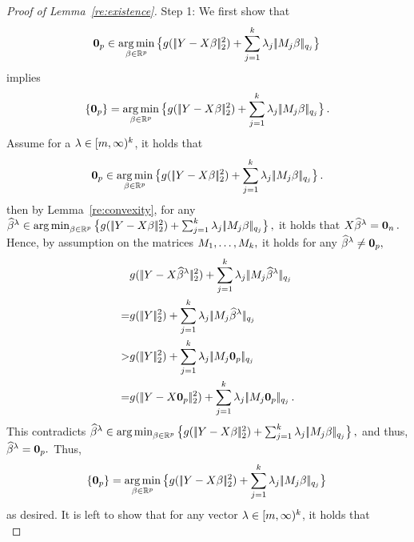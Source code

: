 \documentclass[bj]{imsart}
\newcommand{\normtwo}[1]{\ensuremath{\!|\!| #1 | \! |_{2}}}
\newcommand{\normqj}[1]{\ensuremath{\!|\!| #1 | \! |_{q_j}}}
\newcommand{\1}{{\rm 1}\mskip -4,5mu{\rm l} }
\newcommand{\argmin}{\mathop{\mathrm{arg\,min}}}
\def\R{\mathbb{R}}
\begin{document}
\begin{proof}[Proof of Lemma~\ref{re:existence}]
Step 1:
We first show that 
\begin{equation*}
\bold{0}_p\in \argmin_{\beta\in\R^p} \big\{ g(\,\normtwo{\outcome-\design\beta}^2)+\sum_{j=1}^\numbergroups\lambda_j\,\normqj{\fusedmatrix_j\beta}\big\}\,
\end{equation*}
implies
\begin{equation*}
\{\bold{0}_p\}=\argmin_{\beta\in\R^p} \big\{ g(\,\normtwo{\outcome-\design\beta}^2)+\sum_{j=1}^\numbergroups\lambda_j\,\normqj{\fusedmatrix_j\beta}\big\}\,.
\end{equation*}
Assume for a $\lambda\in[m,\infty)^{k}$, it holds that
\begin{equation*}
\bold{0}_p\in \argmin_{\beta\in\R^p} \big\{ g(\,\normtwo{\outcome-\design\beta}^2)+\sum_{j=1}^\numbergroups\lambda_j\,\normqj{\fusedmatrix_j\beta}\big\}\,.
\end{equation*}
then by Lemma~\ref{re:convexity}, for any $\estimatort\in\argmin_{\beta\in\R^p} \big\{ g(\,\normtwo{\outcome-\design\beta}^2)+\sum_{j=1}^\numbergroups\lambda_j\,\normqj{\fusedmatrix_j\beta}\big\}\,,$ it holds that $\textcolor{black}{X} \widehat \beta^{\lambda}=\bold{0}_n\,.$
Hence, by assumption on the matrices $M_1,\dots,M_{k},$ it holds for any $\widehat \beta^{\lambda}\neq {\bf 0}_p,$
\begin{align*}
&g(\,\normtwo{\outcome-\design\estimatort}^2)+\sum_{j=1}^\numbergroups\lambda_j\,\normqj{\fusedmatrix_j\estimatort}\\
=&g(\,\normtwo{\outcome}^2)+\sum_{j=1}^\numbergroups\lambda_j\,\normqj{\fusedmatrix_j\estimatort}\\
> &g(\,\normtwo{\outcome}^2)+\sum_{j=1}^\numbergroups\lambda_j\,\normqj{\fusedmatrix_j{\bf 0}_p}\\
=&g(\,\normtwo{\outcome-\design{\bf 0}_p}^2)+\sum_{j=1}^\numbergroups\lambda_j\,\normqj{\fusedmatrix_j{\bf 0}_p}\,.
\end{align*}
This contradicts $\estimatort\in\argmin_{\beta\in\R^p} \big\{ g(\,\normtwo{\outcome-\design\beta}^2)+\sum_{j=1}^\numbergroups\lambda_j\,\normqj{\fusedmatrix_j\beta}\big\}\,,$ and thus, $\widehat \beta^{\lambda}={\bf 0}_p.$  Thus,
\begin{equation*}
\{\bold{0}_p\}=\argmin_{\beta\in\R^p} \big\{ g(\,\normtwo{\outcome-\design\beta}^2)+\sum_{j=1}^\numbergroups\lambda_j\,\normqj{\fusedmatrix_j\beta}\big\}\,
\end{equation*}
as desired.
It is left to show that for any vector $\lambda\in[m,\infty)^{k}$, it holds that
\begin{equation*}

\end{equation*}
\end{proof}
\end{document}
